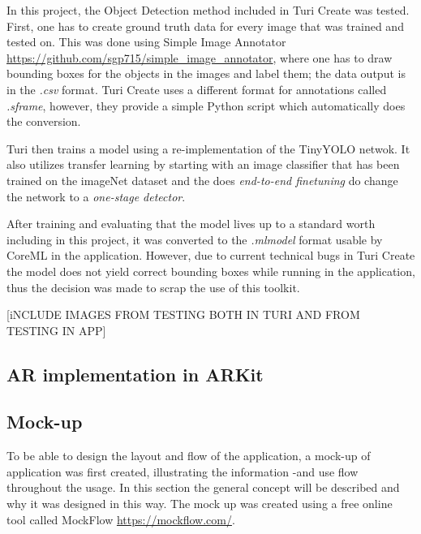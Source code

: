 In this project, the Object Detection method included in Turi Create was tested. First, one has to create ground truth data for every image that was trained and tested on. This was done using Simple Image Annotator \url{https://github.com/sgp715/simple_image_annotator}, where one has to draw bounding boxes for the objects in the images and label them; the data output is in the \textit{.csv} format.  Turi Create uses a different format for annotations called \textit{.sframe}, however, they provide a simple Python script which automatically does the conversion. 

Turi then trains a model using a re-implementation of the TinyYOLO netwok. It also utilizes transfer learning by starting with an image classifier that has been trained on the imageNet dataset and the does \textit{end-to-end finetuning} do change the network to a \textit{one-stage detector}.

After training and evaluating that the model lives up to a standard worth including in this project, it was converted to the \textit{.mlmodel} format usable by CoreML in the application. However, due to current technical bugs in Turi Create the model does not yield correct bounding boxes while running in the application, thus the decision was made to scrap the use of this toolkit.

[iNCLUDE IMAGES FROM TESTING BOTH IN TURI AND FROM TESTING IN APP] 

\subsection{AR implementation in ARKit}

\subsection{Mock-up}
To be able to design the layout and flow of the application, a mock-up of application was first created, illustrating the information -and use flow throughout the usage. In this section the general concept will be described and why it was designed in this way. The mock up was created using a free online tool called MockFlow \url{https://mockflow.com/}. 

